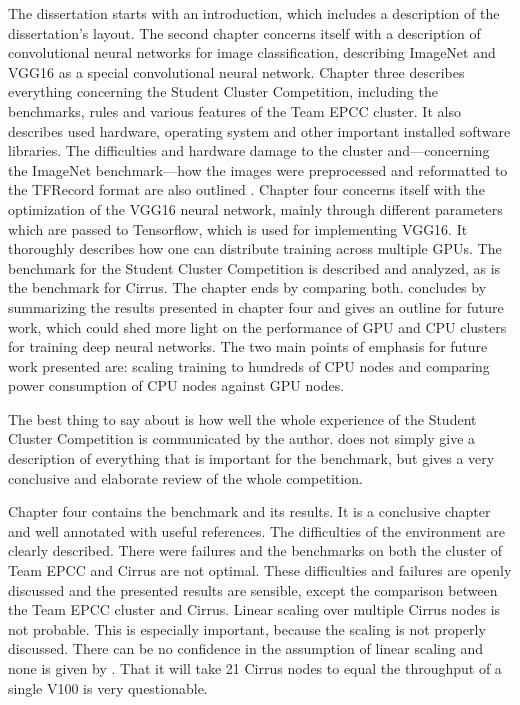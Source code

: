 \documentclass{article}
\begin{document}
The dissertation starts with an introduction, which
includes a description of the dissertation's layout.
The second chapter concerns itself with a description of
convolutional neural networks for image classification,
describing ImageNet and VGG16 as a special convolutional
neural network.
Chapter three describes everything concerning the Student
Cluster Competition, including the benchmarks, rules and
various features of the Team EPCC cluster.
It also describes used hardware, operating system and other important
installed software libraries.
The difficulties and hardware damage to the cluster and---concerning
the ImageNet benchmark---how the images were preprocessed and
reformatted to the TFRecord format are also outlined \citep{tf2015}.
Chapter four concerns itself with the optimization of the
VGG16 neural network, mainly through different parameters
which are passed to Tensorflow, which is used for
implementing VGG16.
It thoroughly describes how one can distribute training
across multiple GPUs.
The benchmark for the Student Cluster Competition is
described and analyzed, as is the benchmark for Cirrus.
The chapter ends by comparing both.
\citet{nita_2018} concludes by summarizing the results
presented in chapter four and gives an outline for future
work, which could shed more light on the performance of
GPU and CPU clusters for training deep neural networks.
The two main points of emphasis for future work presented
are: scaling training to hundreds of CPU nodes
\citep[see e.g.][for distributing training onto multiple CPUs]
{you2017} and comparing power consumption of CPU nodes against GPU
nodes.

The best thing to say about \citet{nita_2018} is how well
the whole experience of the Student Cluster Competition is
communicated by the author.
\citet{nita_2018} does not simply give a description of
everything that is important for the benchmark, but gives
a very conclusive and elaborate review of the whole
competition.

Chapter four contains the benchmark and its results.
It is a conclusive chapter and well annotated with useful
references.
The difficulties of the environment are clearly described.
There were failures and the benchmarks on both the cluster of Team
EPCC and Cirrus are not optimal.
These difficulties and failures are openly discussed and the presented
results are sensible, except the comparison between the Team EPCC
cluster and Cirrus.
Linear scaling over multiple Cirrus nodes is not probable.
This is especially important, because the scaling is not properly
discussed.
There can be no confidence in the assumption of linear scaling and
none is given by \citet{nita_2018}.
That it will take 21 Cirrus nodes to equal the throughput of a single
V100 is very questionable.
\end{document}
